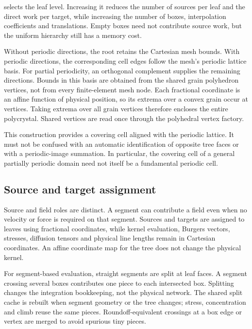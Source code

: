  selects the leaf level. Increasing it reduces the number
of sources per leaf and the direct work per target, while increasing the number
of boxes, interpolation coefficients and translations. Empty boxes need not
contribute source work, but the uniform hierarchy still has a memory cost.

Without periodic directions, the root retains the Cartesian mesh bounds.
With periodic directions, the corresponding cell edges follow the mesh's
periodic lattice basis. For partial periodicity, an orthogonal complement
supplies the remaining directions. Bounds in this basis are obtained from the
shared grain polyhedron vertices, not from every finite-element mesh node.
Each fractional coordinate is an affine function of physical position, so its
extrema over a convex grain occur at vertices. Taking extrema over all grain
vertices therefore encloses the entire polycrystal. Shared vertices are read
once through the polyhedral vertex factory.

This construction provides a covering cell aligned with the periodic lattice.
It must not be confused with an automatic identification of opposite tree
faces or with a periodic-image summation. In particular, the covering cell of
a general partially periodic domain need not itself be a fundamental periodic
cell.

\subsection{Source and target assignment}
Source and field roles are distinct. A segment can contribute a field even
when no velocity or force is required on that segment. Sources and targets
are assigned to leaves using fractional coordinates, while kernel evaluation,
Burgers vectors, stresses, diffusion tensors and physical line lengths remain
in Cartesian coordinates. An affine coordinate map for the tree does not
change the physical kernel.

For segment-based evaluation, straight segments are split at leaf faces.
A segment crossing several boxes contributes one piece to each intersected
box. Splitting changes the integration bookkeeping, not the physical network.
The shared split cache is rebuilt when segment geometry or the tree changes;
stress, concentration and climb reuse the same pieces. Roundoff-equivalent
crossings at a box edge or vertex are merged to avoid spurious tiny pieces.


